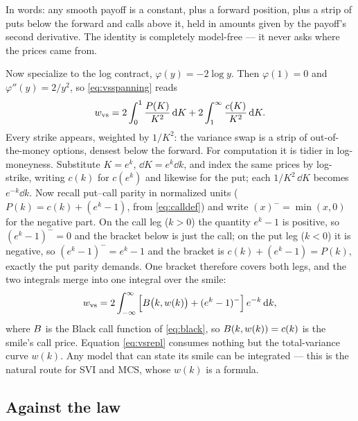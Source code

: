 In words: any smooth payoff is a constant, plus a forward position,
plus a strip of puts below the forward and calls above it, held in
amounts given by the payoff's second derivative.  The identity is
completely model-free --- it never asks where the prices came from.

Now specialize to the log contract, $\varphi(y)=-2\log y$.  Then
$\varphi(1)=0$ and $\varphi''(y)=2/y^{2}$, so
\eqref{eq:vsspanning} reads
\[
w_{\rm vs}
=2\int_0^{1}\frac{P(K)}{K^{2}}\,\mathrm{d} K
+2\int_1^{\infty}\frac{c(K)}{K^{2}}\,\mathrm{d} K .
\]
Every strike appears, weighted by $1/K^{2}$: the variance swap is a
strip of out-of-the-money options, densest below the forward.  For
computation it is tidier in log-moneyness.  Substitute $K=e^{k}$,
$\dd K=e^{k}\dd k$, and index the same prices by log-strike, writing
$c(k)$ for $c(e^{k})$ and likewise for the put; each $1/K^{2}\,\dd K$
becomes $e^{-k}\dd k$.  Now recall put--call parity in normalized
units ($P(k)=c(k)+(e^{k}-1)$, from \cref{eq:calldef}) and write
$(x)^-=\min(x,0)$ for the negative part.  On the call leg ($k>0$) the
quantity $e^{k}-1$ is positive, so $(e^{k}-1)^-=0$ and the bracket
below is just the call; on the put leg ($k<0$) it is negative, so
$(e^{k}-1)^-=e^{k}-1$ and the bracket is $c(k)+(e^{k}-1)=P(k)$,
exactly the put parity demands.  One bracket therefore covers both
legs, and the two integrals merge into one integral over the smile:
\begin{equation}
w_{\rm vs}
=2\int_{-\infty}^{\infty}
\Big[B\big(k,w(k)\big)+(e^{k}-1)^-\Big]\,e^{-k}\,\mathrm{d} k ,
\label{eq:vsrepl}
\end{equation}
where $B$ is the Black call function of \cref{eq:black}, so
$B(k,w(k))=c(k)$ is the smile's call price.  Equation
\eqref{eq:vsrepl} consumes nothing but the total-variance curve
$w(k)$.  Any model that can state its smile can be integrated --- this
is the natural route for SVI and MCS, whose $w(k)$ is a formula.

\subsection{Against the law}

